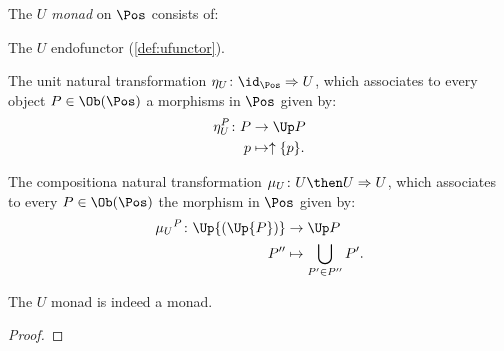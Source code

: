 \begin{definition}[$U$ monad]
The \emph{$U$ monad} on $\Pos$ consists of:
\begin{compactenum}
    \item The $U$ endofunctor (\cref{def:ufunctor}).
    \item The unit natural transformation $\eta_U \colon \id_{\Pos}\Rightarrow U$, which associates to every object $P\in \Ob(\Pos)$ a morphisms in $\Pos$ given by:
    \begin{equation}
        \begin{aligned}
            \eta_{U}^P\colon P &\to \Up P\\
            p&\mapsto \uparrow \{p\}.
        \end{aligned}
    \end{equation}
\item The compositiona natural transformation $\mu_U\colon U\then U\Rightarrow U$, which associates to every $P\in \Ob(\Pos)$ the morphism in $\Pos$ given by:
\begin{equation}
    \begin{aligned}
    \mu{_U}^P\colon \Up{(\Up{P})}&\to \Up P\\
    P''&\mapsto \bigcup_{P'\in P''}P'.
    \end{aligned}
\end{equation}
\end{compactenum}
\end{definition}

\begin{lemma}
The $U$ monad is indeed a monad.
\end{lemma}
\begin{proof}
\end{proof}